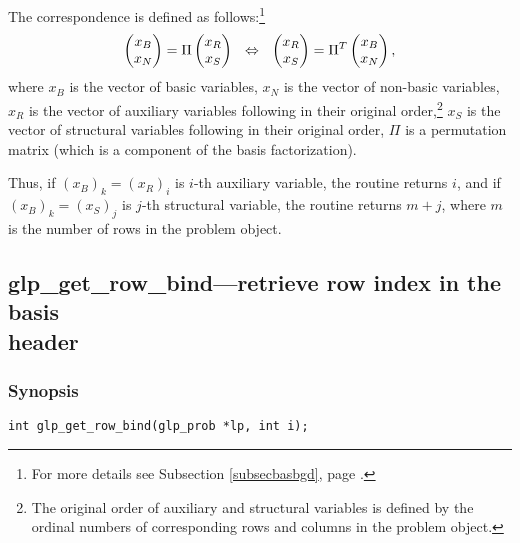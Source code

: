 The correspondence is defined as follows:\footnote{For more details see
Subsection \ref{subsecbasbgd}, page \pageref{subsecbasbgd}.}
$$\left(\begin{array}{@{}c@{}}x_B\\x_N\\\end{array}\right)=
\Pi\left(\begin{array}{@{}c@{}}x_R\\x_S\\\end{array}\right)
\ \ \Leftrightarrow
\ \ \left(\begin{array}{@{}c@{}}x_R\\x_S\\\end{array}\right)=
\Pi^T\left(\begin{array}{@{}c@{}}x_B\\x_N\\\end{array}\right),$$
where $x_B$ is the vector of basic variables, $x_N$ is the vector of
non-basic variables, $x_R$ is the vector of auxiliary variables
following in their original order,\footnote{The original order of
auxiliary and structural variables is defined by the ordinal numbers
of corresponding rows and columns in the problem object.} $x_S$ is the
vector of structural variables following in their original order, $\Pi$
is a permutation matrix (which is a component of the basis
factorization).

Thus, if $(x_B)_k=(x_R)_i$ is $i$-th auxiliary variable, the routine
returns $i$, and if $(x_B)_k=(x_S)_j$ is $j$-th structural variable,
the routine returns $m+j$, where $m$ is the number of rows in the
problem object.


\newpage

\subsection{glp\_get\_row\_bind---retrieve row index in the basis\\
header}

\subsubsection*{Synopsis}

\begin{verbatim}
int glp_get_row_bind(glp_prob *lp, int i);
\end{verbatim}

